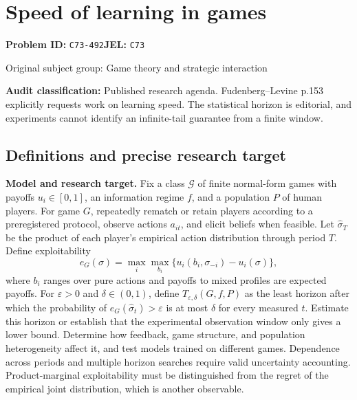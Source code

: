 \documentclass[11pt,a4paper]{article}
\begin{document}
\section*{Speed of learning in games}
\textbf{Problem ID:} \texttt{C73-492}\quad \textbf{JEL:} \texttt{C73}\par
\label{problem:OP-0280}
{\sffamily\small\color{muted}Original subject group: Game theory and strategic interaction\par}
\label{definitions:problem:30007562}
\textbf{Audit classification:} Published research agenda. Fudenberg–Levine p.153 explicitly requests work on learning speed. The statistical horizon is editorial, and experiments cannot identify an infinite-tail guarantee from a finite window.
\subsection*{Definitions and precise research target}
\textbf{Model and research target.} Fix a class \(\mathcal G\) of finite normal-form games with payoffs \(u_i\in[0,1]\), an information regime \(f\), and a population \(P\) of human players. For game \(G\), repeatedly rematch or retain players according to a preregistered protocol, observe actions \(a_{it}\), and elicit beliefs when feasible. Let \(\widehat\sigma_T\) be the product of each player's empirical action distribution through period \(T\). Define exploitability
\[
 e_G(\sigma)=\max_i\max_{b_i}\{u_i(b_i,\sigma_{-i})-u_i(\sigma)\},
\]
where \(b_i\) ranges over pure actions and payoffs to mixed profiles are expected payoffs. For \(\varepsilon>0\) and \(\delta\in(0,1)\), define \(T_{\varepsilon,\delta}(G,f,P)\) as the least horizon after which the probability of \(e_G(\widehat\sigma_t)>\varepsilon\) is at most \(\delta\) for every measured \(t\). Estimate this horizon or establish that the experimental observation window only gives a lower bound. Determine how feedback, game structure, and population heterogeneity affect it, and test models trained on different games. Dependence across periods and multiple horizon searches require valid uncertainty accounting. Product-marginal exploitability must be distinguished from the regret of the empirical joint distribution, which is another observable.
\end{document}
